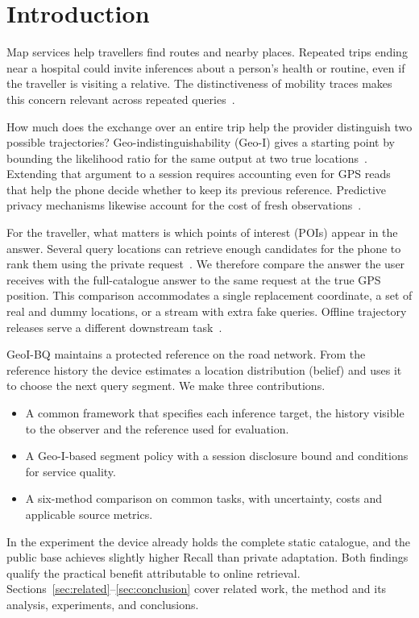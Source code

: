 \section{Introduction}\label{sec:intro}
Map services help travellers find routes and nearby places. Repeated trips ending near a hospital could invite inferences about a person's health or routine, even if the traveller is visiting a relative. The distinctiveness of mobility traces makes this concern relevant across repeated queries~\cite{mobilityunique}.

How much does the exchange over an entire trip help the provider distinguish
two possible trajectories? Geo-indistinguishability (Geo-I) gives a starting
point by bounding the likelihood ratio for the same output at two true
locations~\cite{geoi}. Extending that argument to a session requires accounting
even for GPS reads that help the phone decide whether to keep its previous
reference. Predictive privacy mechanisms likewise account for the cost of
fresh observations~\cite{predictive}.

For the traveller, what matters is which points of interest (POIs) appear in
the answer. Several query locations can retrieve enough candidates for the
phone to rank them using the private request~\cite{ev}. We therefore compare
the answer the user receives with the full-catalogue answer to the same request
at the true GPS position. This comparison accommodates a single replacement
coordinate, a set of real and dummy locations, or a stream with extra fake
queries. Offline trajectory releases serve a different downstream
task~\cite{transprotect,semantic,fake,sok}.



GeoI-BQ maintains a protected reference on the road network. From the reference
history the device estimates a location distribution (belief) and uses it to
choose the next query segment. We make three contributions.
\begin{itemize}
\item A common framework that specifies each inference target, the history visible to the observer and the reference used for evaluation.
\item A Geo-I-based segment policy with a session disclosure bound and conditions for service quality.
\item A six-method comparison on common tasks, with uncertainty, costs and applicable source metrics.
\end{itemize}
In the experiment the device already holds the complete static catalogue,
and the public base achieves slightly higher Recall than private adaptation.
Both findings qualify the practical benefit attributable to online retrieval.
Sections~\ref{sec:related}--\ref{sec:conclusion} cover related work, the
method and its analysis, experiments, and conclusions.
